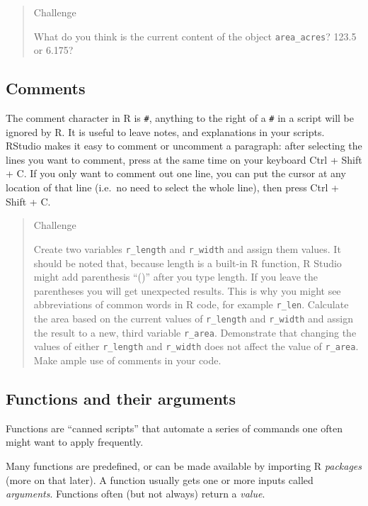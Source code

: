 \documentclass[
]{book}
\begin{document}
\begin{quote}
Challenge

What do you think is the current content of the object \texttt{area\_acres}? 123.5 or 6.175?
\end{quote}

\hypertarget{comments}{%
\subsection{Comments}\label{comments}}

The comment character in R is \texttt{\#}, anything to the right of a \texttt{\#} in a script
will be ignored by R. It is useful to leave notes, and explanations in your
scripts.
RStudio makes it easy to comment or uncomment a paragraph: after selecting the
lines you want to comment, press at the same time on your keyboard
Ctrl + Shift + C. If you only want to comment
out one line, you can put the cursor at any location of that line (i.e.~no need
to select the whole line), then press Ctrl + Shift +
C.

\begin{quote}
Challenge

Create two variables \texttt{r\_length} and \texttt{r\_width} and assign them values. It should be noted that, because length is a built-in R function, R Studio might add parenthesis ``()'' after you type length. If you leave the parentheses you will get unexpected results. This is why you might see abbreviations of common words in R code, for example \texttt{r\_len}. Calculate the area based on the current values of \texttt{r\_length} and \texttt{r\_width} and assign the result to a new, third variable \texttt{r\_area}. Demonstrate that changing the values of either \texttt{r\_length} and \texttt{r\_width} does not affect the value of \texttt{r\_area}. Make ample use of comments in your code.
\end{quote}

\hypertarget{functions-and-their-arguments}{%
\subsection{Functions and their arguments}\label{functions-and-their-arguments}}

Functions are ``canned scripts'' that automate a series of commands one often might want to apply frequently.

Many functions are predefined, or can be
made available by importing R \emph{packages} (more on that later). A function
usually gets one or more inputs called \emph{arguments}. Functions often (but not
always) return a \emph{value}.
\end{document}
